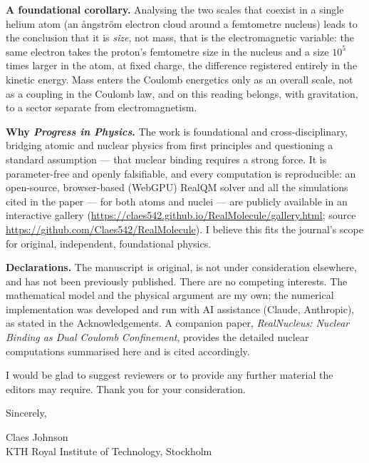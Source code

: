 \documentclass[11pt]{article}
\begin{document}
\medskip
\textbf{A foundational corollary.} Analysing the two scales that coexist in a single helium atom (an
\aa ngstr\"om electron cloud around a femtometre nucleus) leads to the conclusion that it is
\emph{size}, not mass, that is the electromagnetic variable: the same electron takes the proton's
femtometre size in the nucleus and a size $10^5$ times larger in the atom, at fixed charge, the
difference registered entirely in the kinetic energy. Mass enters the Coulomb energetics only as an
overall scale, not as a coupling in the Coulomb law, and on this reading belongs, with gravitation, to
a sector separate from electromagnetism.

\medskip
\textbf{Why \emph{Progress in Physics}.} The work is foundational and cross-disciplinary, bridging
atomic and nuclear physics from first principles and questioning a standard assumption --- that nuclear
binding requires a strong force. It is parameter-free and openly falsifiable, and every computation is
reproducible: an open-source, browser-based (WebGPU) RealQM solver and all the simulations cited in
the paper --- for both atoms and nuclei --- are publicly available in an interactive gallery
(\url{https://claes542.github.io/RealMolecule/gallery.html}; source
\url{https://github.com/Claes542/RealMolecule}). I believe this fits the journal's scope for original,
independent, foundational physics.

\medskip
\textbf{Declarations.} The manuscript is original, is not under consideration elsewhere, and has not
been previously published. There are no competing interests. The mathematical model and the physical
argument are my own; the numerical implementation was developed and run with AI assistance (Claude,
Anthropic), as stated in the Acknowledgements. A companion paper, \emph{RealNucleus: Nuclear Binding as
Dual Coulomb Confinement}, provides the detailed nuclear computations summarised here and is cited
accordingly.

\medskip
I would be glad to suggest reviewers or to provide any further material the editors may require. Thank
you for your consideration.

\bigskip
\noindent Sincerely,

\medskip
\noindent Claes Johnson\\
KTH Royal Institute of Technology, Stockholm
\end{document}
